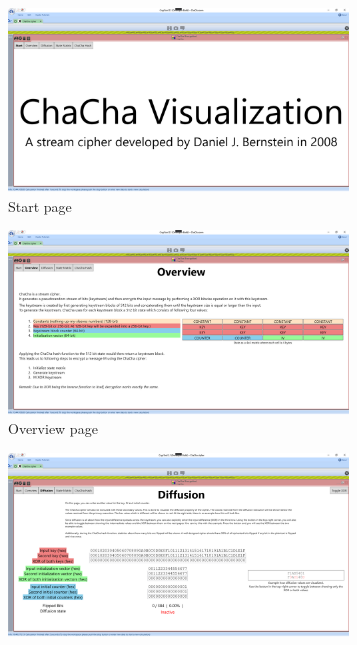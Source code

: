 \begin{figure}
\centering
\begin{subfigure}{.5\textwidth}
  \centering
  \includegraphics[width=0.99\textwidth]{figures/ct2/all-pages/1-start.png}
  \caption{Start page}
\end{subfigure}%
\begin{subfigure}{.5\textwidth}
  \centering
  \includegraphics[width=0.99\textwidth]{figures/ct2/all-pages/2-overview.png}
  \caption{Overview page}
\end{subfigure}
\begin{subfigure}{.5\textwidth}
  \centering
  \includegraphics[width=0.99\textwidth]{figures/ct2/all-pages/3-diffusion.png}

\end{subfigure}
\end{figure}
